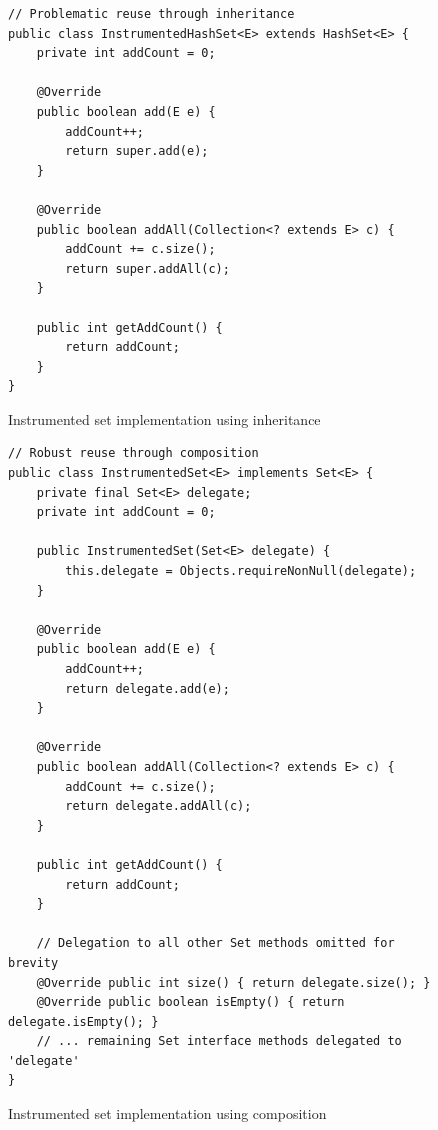 \begin{figure}[htbp]
    \centering
    \begin{verbatim}
// Problematic reuse through inheritance
public class InstrumentedHashSet<E> extends HashSet<E> {
    private int addCount = 0;

    @Override
    public boolean add(E e) {
        addCount++;
        return super.add(e);
    }

    @Override
    public boolean addAll(Collection<? extends E> c) {
        addCount += c.size();
        return super.addAll(c);
    }

    public int getAddCount() {
        return addCount;
    }
}
    \end{verbatim}
    \caption{Instrumented set implementation using inheritance}
    \label{fig:instrumented-hashset-inheritance}
\end{figure}

\begin{figure}[htbp]
    \centering
    \begin{verbatim}
// Robust reuse through composition
public class InstrumentedSet<E> implements Set<E> {
    private final Set<E> delegate;
    private int addCount = 0;

    public InstrumentedSet(Set<E> delegate) {
        this.delegate = Objects.requireNonNull(delegate);
    }

    @Override
    public boolean add(E e) {
        addCount++;
        return delegate.add(e);
    }

    @Override
    public boolean addAll(Collection<? extends E> c) {
        addCount += c.size();
        return delegate.addAll(c);
    }

    public int getAddCount() {
        return addCount;
    }

    // Delegation to all other Set methods omitted for brevity
    @Override public int size() { return delegate.size(); }
    @Override public boolean isEmpty() { return delegate.isEmpty(); }
    // ... remaining Set interface methods delegated to 'delegate'
}
    \end{verbatim}
    \caption{Instrumented set implementation using composition}
    \label{fig:instrumented-set-composition}
\end{figure}

